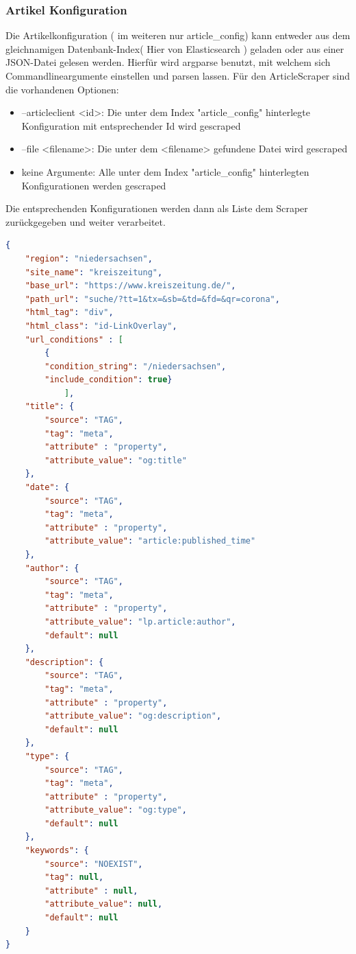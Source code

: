 \documentclass[12pt,oneside,a4paper,parskip]{scrbook}
\begin{document}
\subsubsection{Artikel Konfiguration}
Die Artikelkonfiguration ( im weiteren nur article\_config) kann entweder aus dem gleichnamigen Datenbank-Index( Hier von  Elasticsearch ) geladen oder aus einer JSON-Datei gelesen werden. Hierfür wird argparse benutzt, mit welchem sich Commandlineargumente einstellen und parsen lassen. Für den ArticleScraper sind die vorhandenen Optionen:
\begin{itemize}
\item --articleclient <id>: Die unter dem Index "article\_config" hinterlegte Konfiguration mit entsprechender Id wird gescraped
\item --file <filename>: Die unter dem <filename> gefundene Datei wird gescraped
\item keine Argumente: Alle unter dem Index "article\_config" hinterlegten Konfigurationen werden gescraped
\end{itemize}

Die entsprechenden Konfigurationen werden dann als Liste dem Scraper zurückgegeben und weiter verarbeitet.
\begin{lstlisting}[caption=article\_config am Beispiel Niedersachsen,label=articleconfig,language=json]
{
    "region": "niedersachsen",
    "site_name": "kreiszeitung",
    "base_url": "https://www.kreiszeitung.de/",
    "path_url": "suche/?tt=1&tx=&sb=&td=&fd=&qr=corona",
    "html_tag": "div",
    "html_class": "id-LinkOverlay",
    "url_conditions" : [
        {
        "condition_string": "/niedersachsen",
        "include_condition": true}
        	],
    "title": {
        "source": "TAG",
        "tag": "meta",
        "attribute" : "property",
        "attribute_value": "og:title"
    },
    "date": {
        "source": "TAG",
        "tag": "meta",
        "attribute" : "property",
        "attribute_value": "article:published_time"
    },
    "author": {
        "source": "TAG",
        "tag": "meta",
        "attribute" : "property",
        "attribute_value": "lp.article:author",
        "default": null
    },
    "description": {
        "source": "TAG",
        "tag": "meta",
        "attribute" : "property",
        "attribute_value": "og:description",
        "default": null
    },
    "type": {
        "source": "TAG",
        "tag": "meta",
        "attribute" : "property",
        "attribute_value": "og:type",
        "default": null
    },
    "keywords": {
        "source": "NOEXIST",
        "tag": null,
        "attribute" : null,
        "attribute_value": null,
        "default": null
    }
}
\end{lstlisting}
\end{document}
